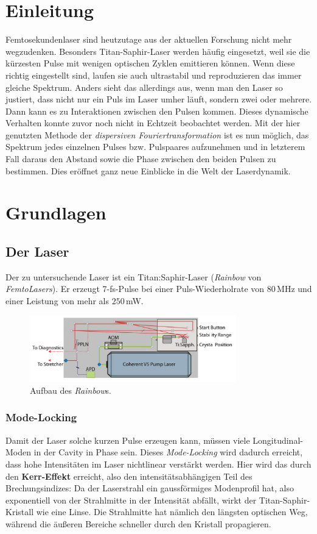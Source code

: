 \documentclass[bachelor,       %
               twoside,        %
               BCOR10mm,       %
               english,ngerman, %
               ]{GAUBM}
\begin{document}
\mainmatter   %

\chapter{Einleitung}
Femtosekundenlaser sind heutzutage aus der aktuellen Forschung nicht mehr wegzudenken.
Besonders Titan-Saphir-Laser werden häufig eingesetzt, weil sie die kürzesten Pulse mit wenigen optischen Zyklen emittieren können.
Wenn diese richtig eingestellt sind, laufen sie auch ultrastabil und reproduzieren das immer gleiche Spektrum.
Anders sieht das allerdings aus, wenn man den Laser so justiert, dass nicht nur ein Puls im Laser umher läuft, sondern zwei oder mehrere.
Dann kann es zu Interaktionen zwischen den Pulsen kommen.
Dieses dynamische Verhalten konnte zuvor noch nicht in Echtzeit beobachtet werden.
Mit der hier genutzten Methode der \textit{dispersiven Fouriertransformation} ist es nun möglich, das Spektrum jedes einzelnen Pulses bzw. Pulspaares aufzunehmen und in letzterem Fall daraus den Abstand sowie die Phase zwischen den beiden Pulsen zu bestimmen.
Dies eröffnet ganz neue Einblicke in die Welt der Laserdynamik.


\chapter{Grundlagen}

\section{Der Laser}
Der zu untersuchende Laser ist ein Titan:Saphir-Laser (\textit{Rainbow} von \textit{FemtoLasers}).
Er erzeugt 7-fs-Pulse bei einer Puls-Wiederholrate von $80\,$MHz und einer Leistung von mehr als $250\,$mW.
\begin{figure}[!htb]
	\centering
	\includegraphics[width=0.8\textwidth]{figures/rainbow.png}
	\caption{Aufbau des \textit{Rainbow}s.}
	\label{fig:rainbow}
\end{figure}
\subsection{Mode-Locking}
Damit der Laser solche kurzen Pulse erzeugen kann, müssen viele Longitudinal-Moden in der Cavity in Phase sein.
Dieses \emph{Mode-Locking} wird dadurch erreicht, dass hohe Intensitäten im Laser nichtlinear verstärkt werden.
Hier wird das durch den \textbf{Kerr-Effekt} erreicht, also den intensitätsabhängigen Teil des Brechungsindizes: 
Da der Laserstrahl ein gaussförmiges Modenprofil hat, also exponentiell von der Strahlmitte in der Intensität abfällt, wirkt der Titan-Saphir-Kristall wie eine Linse.
Die Strahlmitte hat nämlich den längsten optischen Weg, während die äußeren Bereiche schneller durch den Kristall propagieren.
\end{document}
